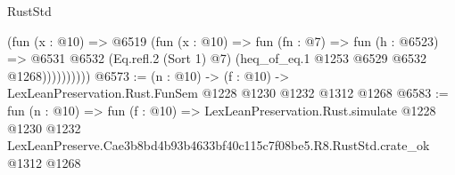 \begin{lexlean}{RustStd}
\begin{coremodule}
                  (fun (x : @10) =>
                  @6519
                    (fun (x : @10) =>
                    fun (fn : @7) =>
                    fun (h : @6523) =>
                    @6531
                      @6532
                      (Eq.refl.{2} (Sort 1) @7)
                      (heq_of_eq.{1} @1253 @6529 @6532 @1268))))))))))
@6573 := (n : @10) -> (f : @10) -> LexLeanPreservation.Rust.FunSem @1228 @1230 @1232 @1312 @1268
@6583 := fun (n : @10) =>
  fun (f : @10) =>
  LexLeanPreservation.Rust.simulate
    @1228
    @1230
    @1232
    LexLeanPreserve.Cae3b8bd4b93b4633bf40c115c7f08be5.R8.RustStd.crate_ok
    @1312
    @1268
\end{coremodule}
\end{lexlean}
